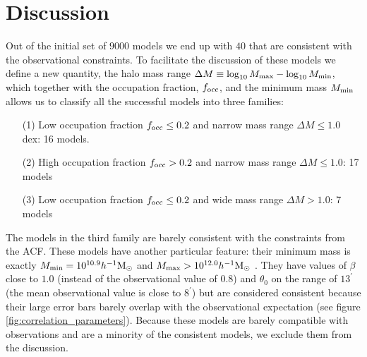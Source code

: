 \documentclass{emulateapj}
\newcommand{\hMsun}{{\ifmmode{h^{-1}{\rm
        {M_{\odot}}}}\else{$h^{-1}{\rm{M_{\odot}}}$}\fi}}
\begin{document}
\section{Discussion}
\label{sec:discussion}

Out of the initial set of $9000$ models we end up with $40$ that are
consistent with the observational constraints. To facilitate the
discussion of these models we define a new quantity, the halo mass
range $\Delta M\equiv \log_{10}M_{\rm max} - \log_{10}M_{\rm  min}$, which
together with the occupation fraction, $f_{\rm occ}$, and the minimum
mass $M_{\rm min}$ allows us to classify all the successful models into
three families:     
  
\begin{itemize}
\item[(1)] Low occupation fraction $f_{\rm occ}\leq 0.2$ and narrow
  mass range $\Delta M\leq 1.0$ 
  dex: 16 models. 
\item[(2)] High occupation fraction $f_{\rm occ}> 0.2$ and
  narrow mass range $\Delta M\leq 1.0$: 17 models 
\item[(3)] Low occupation fraction $f_{\rm occ}\leq 0.2$ 
  and wide mass range $\Delta M>1.0$: 7 models
\end{itemize}

The models in the third family are barely consistent with the
constraints from the ACF. These models have another particular
feature: their minimum mass is exactly $M_{\rm min}=10^{10.9}\hMsun$
and $M_{\rm max}>10^{12.0}\hMsun$ . They have values of $\beta$
close to $1.0$ (instead of the observational value of $0.8$) and
$\theta_0$ on the range of $13^{\prime}$ (the mean observational
value is close to $8^{\prime}$) but are considered consistent
because their large error bars barely overlap with the observational
expectation (see figure \ref{fig:correlation_parameters}).
Because these models are barely compatible with observations and
are a minority of the consistent models, we exclude them from the
discussion.
\end{document}
